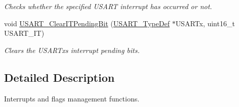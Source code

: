\begin{DoxyCompactItemize}
\begin{DoxyCompactList}\small\item\em Checks whether the specified U\+S\+A\+RT interrupt has occurred or not. \end{DoxyCompactList}\item 
void \hyperlink{group___u_s_a_r_t___group9_ga1fc25d0338695063be5e50156955d9bc}{U\+S\+A\+R\+T\+\_\+\+Clear\+I\+T\+Pending\+Bit} (\hyperlink{struct_u_s_a_r_t___type_def}{U\+S\+A\+R\+T\+\_\+\+Type\+Def} $\ast$U\+S\+A\+R\+Tx, uint16\+\_\+t U\+S\+A\+R\+T\+\_\+\+IT)
\begin{DoxyCompactList}\small\item\em Clears the U\+S\+A\+R\+Tx\textquotesingle{}s interrupt pending bits. \end{DoxyCompactList}\end{DoxyCompactItemize}


\subsection{Detailed Description}
Interrupts and flags management functions. 

